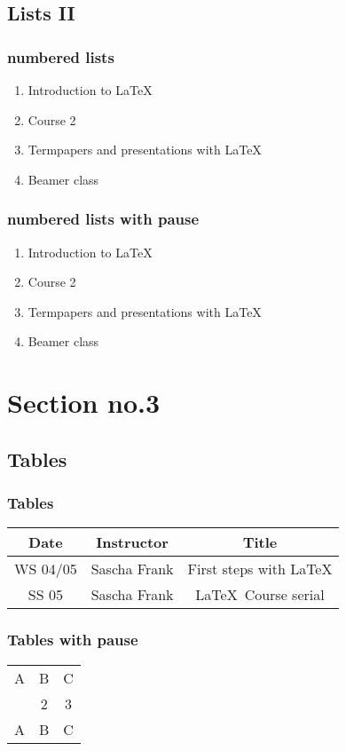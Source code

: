 \documentclass[handout]{beamer}
\begin{document}
\subsection{Lists II}
\begin{frame}\frametitle{numbered lists}
\begin{enumerate}
\item Introduction to  \LaTeX  
\item Course 2 
\item Termpapers and presentations with \LaTeX 
\item Beamer class
\end{enumerate}
\end{frame}

\begin{frame}\frametitle{numbered lists with pause}
\begin{enumerate}
\item Introduction to  \LaTeX \pause 
\item Course 2 \pause 
\item Termpapers and presentations with \LaTeX \pause 
\item Beamer class
\end{enumerate}
\end{frame}

\section{Section no.3} 
\subsection{Tables}
\begin{frame}\frametitle{Tables}
\begin{tabular}{|c|c|c|}
\hline
\textbf{Date} & \textbf{Instructor} & \textbf{Title} \\
\hline
WS 04/05 & Sascha Frank & First steps with  \LaTeX  \\
\hline
SS 05 & Sascha Frank & \LaTeX \ Course serial \\
\hline
\end{tabular}
\end{frame}


\begin{frame}\frametitle{Tables with pause}
\begin{tabular}{c c c}
A & B & C \\ 
\pause 
1 & 2 & 3 \\  
\pause 
A & B & C \\ 
\end{tabular} 
\end{frame}
\end{document}
